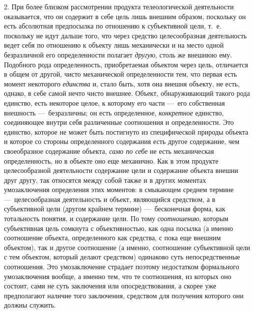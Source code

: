 \documentclass[twoside]{article}
\begin{document}
{{{{2. При более близком рассмотрении продукта телеологической
деятельности оказывается, что он содержит в себе цель лишь внешним образом,
поскольку он есть абсолютная предпосылка по отношению к субъективной цели,
т.~е. поскольку не идут дальше того, что через средство целесообразная
деятельность ведет себя по отношению к объекту лишь механически и на место
одной безразличной его определенности полагает {\em другую}, столь же
внешнюю ему. Подобного рода определенность, приобретаемая объектом через
цель, отличается в общем от другой, чисто механической
определенности тем, что первая есть момент некоторого
{\em единства} и, стало
быть, хотя она внешня объекту, не есть, однако, в себе самой нечто чисто
внешнее. Объект, обнаруживающий такого рода единство, есть некоторое целое,
к которому его части —~его собственная внешность 
—~безразличны; он есть определенное,
{\em конкретное}
единство, соединяющее внутри себя различенные соотношения и
определенности. Это единство, которое не может быть постигнуто из
специфической природы объекта и которое со стороны определенного содержания
есть другое содержание, чем своеобразное содержание объекта,
{\em само по себе} не
есть механическая определенность, но в объекте оно еще механично. Как в
этом продукте целесообразной деятельности содержание цели и содержание
объекта внешни друг другу, так относятся между собой также и в других
моментах умозаключения определения этих моментов: в смыкающем среднем
термине —~целесообразная деятельность и объект, являющийся
средством, а в субъективной цели (другом крайнем термине)
—~бесконечная форма, как тотальность понятия, и содержание
цели. По тому {\em соотношению},
которым субъективная цель сомкнута с объективностью, как одна
посылка (а именно соотношение объекта, определенного как средства, с пока
еще внешним объектом), так и другое соотношение (а именно, соотношение
субъективной цели с тем объектом, который делают средством) одинаково суть
непосредственные соотношения. Это умозаключение страдает поэтому
недостатком формального умозаключения вообще, а именно тем, что те
соотношения, из которых оно состоит, сами не суть заключения или
опосредствования, а скорее уже предполагают наличие того заключения,
средством для получения которого они должны служить.

}}}}
\end{document}
